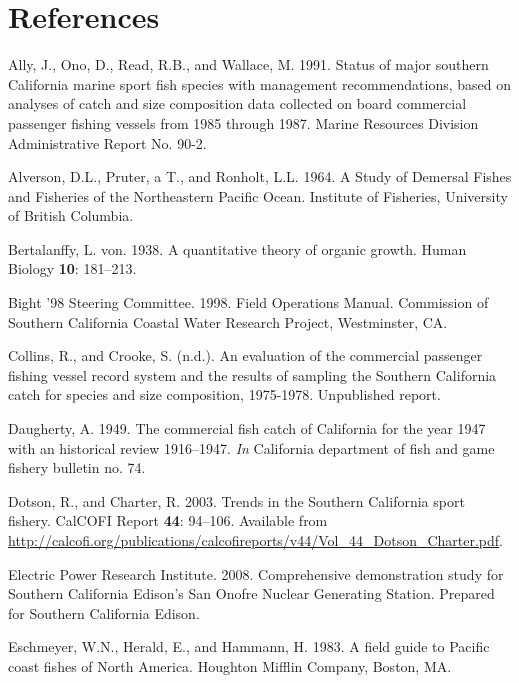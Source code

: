 \documentclass[12pt,]{article}
\begin{document}
\section*{References}\label{references}

\renewcommand{\thepage}{}

\hypertarget{refs}{}
\hypertarget{ref-Ally1991}{}
Ally, J., Ono, D., Read, R.B., and Wallace, M. 1991. Status of major
southern California marine sport fish species with management
recommendations, based on analyses of catch and size composition data
collected on board commercial passenger fishing vessels from 1985
through 1987. Marine Resources Division Administrative Report No. 90-2.

\hypertarget{ref-Alverson1964}{}
Alverson, D.L., Pruter, a T., and Ronholt, L.L. 1964. A Study of
Demersal Fishes and Fisheries of the Northeastern Pacific Ocean.
Institute of Fisheries, University of British Columbia.

\hypertarget{ref-vonB1938}{}
Bertalanffy, L. von. 1938. A quantitative theory of organic growth.
Human Biology \textbf{10}: 181--213.

\hypertarget{ref-Bight1998}{}
Bight '98 Steering Committee. 1998. Field Operations Manual. Commission
of Southern California Coastal Water Research Project, Westminster, CA.

\hypertarget{ref-Collins1978}{}
Collins, R., and Crooke, S. (n.d.). An evaluation of the commercial
passenger fishing vessel record system and the results of sampling the
Southern California catch for species and size composition, 1975-1978.
Unpublished report.

\hypertarget{ref-Daugherty1949}{}
Daugherty, A. 1949. The commercial fish catch of California for the year
1947 with an historical review 1916--1947. \emph{In} California
department of fish and game fishery bulletin no. 74.

\hypertarget{ref-Dotson2003}{}
Dotson, R., and Charter, R. 2003. Trends in the Southern California
sport fishery. CalCOFI Report \textbf{44}: 94--106. Available from
\url{http://calcofi.org/publications/calcofireports/v44/Vol_44_Dotson_Charter.pdf}.

\hypertarget{ref-EPRI2008}{}
Electric Power Research Institute. 2008. Comprehensive demonstration
study for Southern California Edison's San Onofre Nuclear Generating
Station. Prepared for Southern California Edison.

\hypertarget{ref-Eschmeyer1983}{}
Eschmeyer, W.N., Herald, E., and Hammann, H. 1983. A field guide to
Pacific coast fishes of North America. Houghton Mifflin Company, Boston,
MA.
\end{document}
